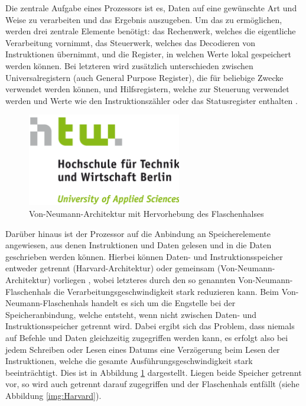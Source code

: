 \documentclass[11pt,a4paper,titlepage]{article}
\begin{document}
Die zentrale Aufgabe eines Prozessors ist es, Daten auf eine gewünschte Art und Weise zu verarbeiten und das Ergebnis auszugeben. Um das zu ermöglichen, werden drei zentrale Elemente benötigt: das Rechenwerk, welches die eigentliche Verarbeitung vornimmt, das Steuerwerk, welches das Decodieren von Instruktionen übernimmt, und die Register, in welchen Werte lokal gespeichert werden können. Bei letzteren wird zusätzlich unterschieden zwischen Universalregistern (auch General Purpose Register), die für beliebige Zwecke verwendet werden können, und Hilfsregistern, welche zur Steuerung verwendet werden und Werte wie den Instruktionszähler oder das Statusregister enthalten \cite[S. 357]{Hoffmann}.


\begin{figure}[!ht]
\centering
\includegraphics[width=0.6\textwidth]{images/htw_hochschule.png}
\caption{Von-Neumann-Architektur mit Hervorhebung des Flaschenhalses}
\label{img:vonNeumann}
\end{figure}


Darüber hinaus ist der Prozessor auf die Anbindung an Speicherelemente angewiesen, aus denen Instruktionen und Daten gelesen und in die Daten geschrieben werden können. Hierbei können Daten- und Instruktionsspeicher entweder getrennt (Harvard-Architektur) oder gemeinsam (Von-Neumann-Architektur) vorliegen \cite[S.352 ff.]{Hoffmann}, wobei letzteres durch den so genannten Von-Neumann-Flaschenhals die Verarbeitungsgeschwindigkeit stark reduzieren kann. Beim Von-Neumann-Flaschenhals handelt es sich um die Engstelle bei der Speicheranbindung, welche entsteht, wenn nicht zwischen Daten- und Instruktionsspeicher getrennt wird. Dabei ergibt sich das Problem, dass niemals auf Befehle und Daten gleichzeitig zugegriffen werden kann, es erfolgt also bei jedem Schreiben oder Lesen eines Datums eine Verzögerung beim Lesen der Instruktionen, welche die gesamte Ausführungsgeschwindigkeit stark beeinträchtigt. Dies ist in Abbildung \ref{img:vonNeumann} dargestellt. Liegen beide Speicher getrennt vor, so wird auch getrennt darauf zugegriffen und der Flaschenhals entfällt (siehe Abbildung \ref{img:Harvard}).
\end{document}
